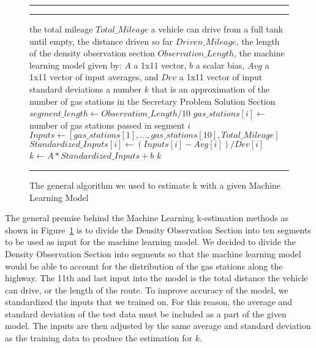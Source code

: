\begin{figure}[!hbt]
\vspace{0.2cm}
\hrule \medskip {} \smallskip
\hrule
\smallskip
\begin{algorithmic}[1]
 the total mileage $Total\_Mileage$ a vehicle can drive from a full tank until empty, the distance driven so far $Driven\_Mileage$, the length of the density observation section $Observation\_Length$, the machine learning model given by: $A$ a 1x11 vector, $b$ a scalar bias, $Avg$ a 1x11 vector of input averages, and $Dev$ a 1x11 vector of input standard deviations
 a number $k$ that is an approximation of the number of gas stations in the Secretary Problem Solution Section
\STATE $segment\_length \gets Observation\_Length / 10$
\STATE $gas\_stations[i] \gets $ number of gas stations passed in segment $i$
\ENDFOR \\
\STATE $Inputs \gets [gas\_stations[1],\ldots, gas\_stations[10], Total\_Mileage]$
\STATE $Standardized\_Inputs[i] \gets (Inputs[i] - Avg[i]) / Dev[i]$
\ENDFOR
\STATE $k \gets A * Standardized\_Inputs + b$
\RETURN $k$
\end{algorithmic}
\hrule
\caption{The general algorithm we used to estimate k with a given Machine Learning Model}
\label{fig:ml-est}
\end{figure}

The general premise behind the Machine Learning k-estimation methods as shown in Figure~\ref{fig:ml-est} is to divide the Density Observation Section into ten segments to be used as input for the machine learning model. We decided to divide the Density Observation Section into segments so that the machine learning model would be able to account for the distribution of the gas stations along the highway. The 11th and last input into the model is the total distance the vehicle can drive, or the length of the route. To improve accuracy of the model, we standardized the inputs that we trained on. For this reason, the average and standard deviation of the test data must be included as a part of the given model. The inputs are then adjusted by the same average and standard deviation as the training data to produce the estimation for $k$.
